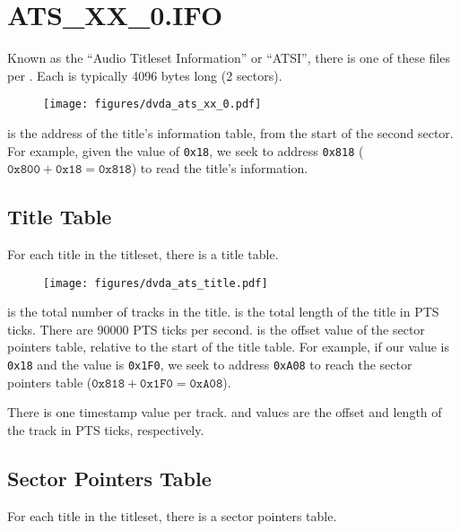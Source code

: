 \section{ATS\_XX\_0.IFO}
Known as the ``Audio Titleset Information'' or ``ATSI'',
there is one of these files per .
Each is typically 4096 bytes long (2 sectors).
\begin{figure}[h]
\texttt{[image: figures/dvda\_ats\_xx\_0.pdf]}
\end{figure}
\par
\noindent
{} is the address of the title's
information table, from the start of the second sector.
For example, given the  value of
\texttt{0x18}, we seek to address \texttt{0x818}
($\texttt{0x800} + \texttt{0x18} = \texttt{0x818}$)
to read the title's information.

\clearpage

\subsection{Title Table}

For each title in the titleset, there is a title table.

\begin{figure}[h]
\texttt{[image: figures/dvda\_ats\_title.pdf]}
\end{figure}
\par
\noindent
{} is the total number of tracks in the title.
 is the total length of the title in
PTS ticks.
There are 90000 PTS ticks per second.
 is the offset value of the
sector pointers table, relative to the start of the title table.
For example, if our  value is
\texttt{0x18} and the  value is
\texttt{0x1F0}, we seek to address \texttt{0xA08}
to reach the sector pointers table
($\texttt{0x818} + \texttt{0x1F0} = \texttt{0xA08}$).
\par
There is one timestamp value per track.
 and  values
are the offset and length of the track in PTS ticks, respectively.

\subsection{Sector Pointers Table}

For each title in the titleset, there is a sector pointers table.

